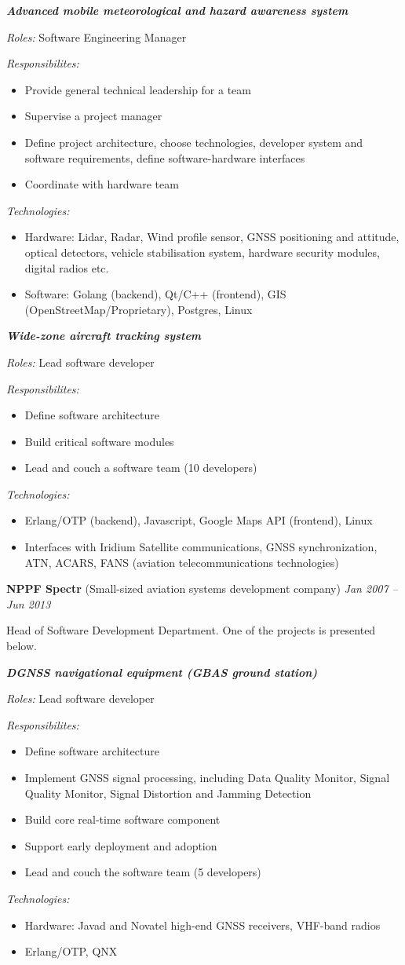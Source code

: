 \documentclass[a4paper]{article}
\newcommand{\project}[4]{

	\textbf{\textit{#1}}
    \vspace{2mm}

    \textit{Roles:} #2
    \vspace{2mm}

    \textit{Responsibilites:}
	\begin{itemize}
	    \setlength{\itemindent}{.5cm}
	    #3
    \end{itemize}
    
	\textit{Technologies:}
	\begin{itemize}
		\setlength{\itemindent}{.5cm}
		#4
	\end{itemize}
}
\begin{document}
	\project{Advanced mobile meteorological and hazard awareness system}{
		Software Engineering Manager
	}{
		\item Provide general technical leadership for a team
		\item Supervise a project manager
		\item Define project architecture, choose technologies, developer system and software requirements, define software-hardware interfaces
		\item Coordinate with hardware team
	}{
		\item Hardware: Lidar, Radar, Wind profile sensor, GNSS positioning and attitude, optical detectors, vehicle stabilisation system, hardware security modules, digital radios etc.
		\item Software: Golang (backend), Qt/C++ (frontend), GIS (OpenStreetMap/Proprietary), Postgres, Linux
	}
    \vspace{2mm}

	\project{Wide-zone aircraft tracking system}{
		Lead software developer
	}{
		\item Define software architecture
		\item Build critical software modules
		\item Lead and couch a software team (10 developers)
	}{
		\item Erlang/OTP (backend), Javascript, Google Maps API (frontend), Linux
		\item Interfaces with Iridium Satellite communications, GNSS synchronization, ATN, ACARS, FANS (aviation telecommunications technologies)
	}
    
    \vspace{3mm}
    \textbf{NPPF Spectr} (Small-sized aviation systems development company) \hfill \textit{Jan 2007 -- Jun 2013}

    \vspace{2mm}
	Head of Software Development Department. One of the projects is presented below.\\
    \vspace{2mm}

	\project{DGNSS navigational equipment (GBAS ground station)}{
		Lead software developer
	}{
		\item Define software architecture
		\item Implement GNSS signal processing, including Data Quality Monitor, Signal Quality Monitor, Signal Distortion and Jamming Detection
		\item Build core real-time software component
		\item Support early deployment and adoption
		\item Lead and couch the software team (5 developers)
	}{
		\item Hardware: Javad and Novatel high-end GNSS receivers, VHF-band radios
		\item Erlang/OTP, QNX
	}
    
\end{document}
